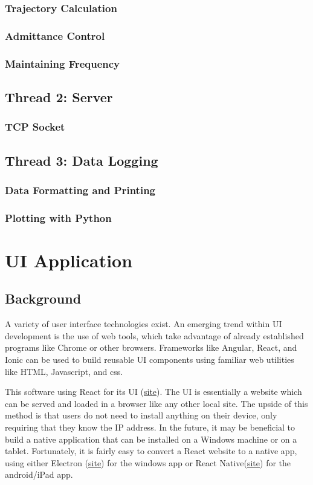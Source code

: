 \documentclass{article}
\begin{document}
	\subsubsection{Trajectory Calculation}
	\subsubsection{Admittance Control}
	\subsubsection{Maintaining Frequency}
	

	\subsection{Thread 2: Server}
	\subsubsection{TCP Socket}
	
	\subsection{Thread 3: Data Logging}
	\subsubsection{Data Formatting and Printing}
	\subsubsection{Plotting with Python}

\section{UI Application}
	\subsection{Background}
	
	A variety of user interface technologies exist. An emerging trend within UI development is the use of web tools, which take advantage of already established programs like Chrome or other browsers. Frameworks like Angular, React, and Ionic can be used to build reusable UI components using familiar web utilities like HTML, Javascript, and css. 
	
	This software using React for its UI (\href{https://reactjs.org/}{site}). The UI is essentially a website which can be served and loaded in a browser like any other local site. The upside of this method is that users do not need to install anything on their device, only requiring that they know the IP address. In the future, it may be beneficial to build a native application that can be installed on a Windows machine or on a tablet. Fortunately, it is fairly easy to convert a React website to a native app, using either Electron (\href{https://electronjs.org/}{site}) for the windows app or React Native(\href{https://facebook.github.io/react-native/}{site}) for the android/iPad app. 
	
\end{document}
